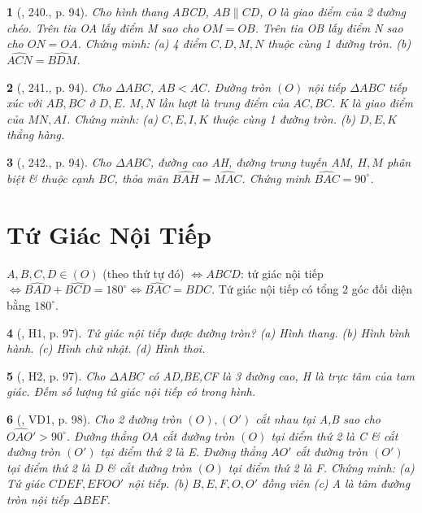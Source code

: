 \documentclass{article}
\newtheorem{baitoan}{}
\begin{document}
\begin{baitoan}[\cite{Binh_Toan_9_tap_2}, 240., p. 94]
	Cho hình thang ABCD, $AB\parallel CD$, O là giao điểm của 2 đường chéo. Trên tia OA lấy điểm M sao cho $OM = OB$. Trên tia OB lấy điểm N sao cho $ON = OA$. Chứng minh: (a) 4 điểm $C,D,M,N$ thuộc cùng 1 đường tròn. (b) $\widehat{ACN} = \widehat{BDM}$.
\end{baitoan}

\begin{baitoan}[\cite{Binh_Toan_9_tap_2}, 241., p. 94]
	Cho $\Delta ABC$, $AB < AC$. Đường tròn $(O)$ nội tiếp $\Delta ABC$ tiếp xúc với $AB,BC$ ở $D,E$. $M,N$ lần lượt là trung điểm của $AC,BC$. K là giao điểm của $MN,AI$. Chứng minh: (a) $C,E,I,K$ thuộc cùng 1 đường tròn. (b) $D,E,K$ thẳng hàng.
\end{baitoan}

\begin{baitoan}[\cite{Binh_Toan_9_tap_2}, 242., p. 94]
	Cho $\Delta ABC$, đường cao AH, đường trung tuyến AM, $H,M$ phân biệt \& thuộc cạnh BC, thỏa mãn $\widehat{BAH} = \widehat{MAC}$. Chứng minh $\widehat{BAC} = 90^\circ$.
\end{baitoan}


\section{Tứ Giác Nội Tiếp}
 $A,B,C,D\in(O)$ (theo thứ tự đó) $\Leftrightarrow ABCD$: tứ giác nội tiếp $\Leftrightarrow\widehat{BAD} + \widehat{BCD} = 180^\circ\Leftrightarrow\widehat{BAC} = \widehat{BDC}$.  Tứ giác nội tiếp có tổng 2 góc đối diện bằng $180^\circ$.

\begin{baitoan}[\cite{Binh_boi_duong_Toan_9_tap_2}, H1, p. 97]
	Tứ giác nội tiếp được đường tròn? (a) Hình thang. (b) Hình bình hành. (c) Hình chữ nhật. (d) Hình thoi.
\end{baitoan}

\begin{baitoan}[\cite{Binh_boi_duong_Toan_9_tap_2}, H2, p. 97]
	Cho $\Delta ABC$ có AD,BE,CF là 3 đường cao, H là trực tâm của tam giác. Đếm số lượng tứ giác nội tiếp có trong hình.
\end{baitoan}

\begin{baitoan}[\cite{Binh_boi_duong_Toan_9_tap_2}, VD1, p. 98]
	Cho 2 đường tròn $(O),(O')$ cắt nhau tại A,B sao cho $\widehat{OAO'} > 90^\circ$. Đường thẳng OA cắt đường tròn $(O)$ tại điểm thứ 2 là C \& cắt đường tròn $(O')$ tại điểm thứ 2 là E. Đường thẳng $AO'$ cắt đường tròn $(O')$ tại điểm thứ 2 là D \& cắt đường tròn $(O)$ tại điểm thứ 2 là F. Chứng minh: (a) Tứ giác $CDEF,EFOO'$ nội tiếp. (b) $B,E,F,O,O'$ đồng viên (c) A là tâm đường tròn nội tiếp $\Delta BEF$.
\end{baitoan}
\end{document}
